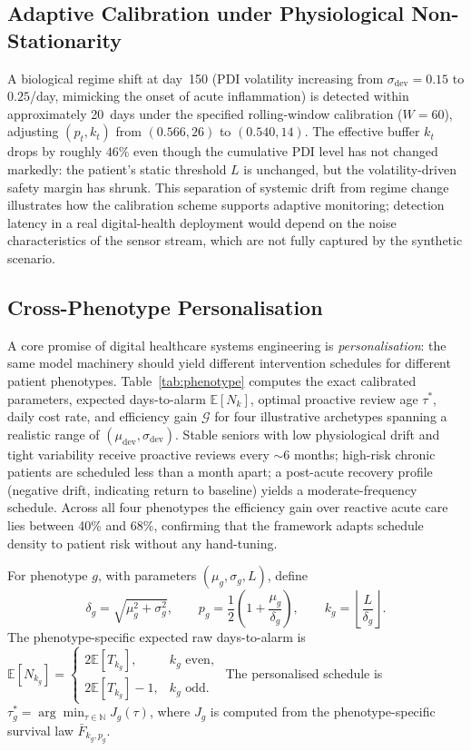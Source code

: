 \documentclass[pdflatex,sn-mathphys-num]{sn-jnl}
\theoremstyle{definition}
\newcommand{\E}{\mathbb{E}}
\numberwithin{equation}{section}
\begin{document}
\subsection{Adaptive Calibration under Physiological Non-Stationarity}\label{sec:case_rolling}

A biological regime shift at day~150 (PDI volatility increasing from $\sigma_{\mathrm{dev}}{=}0.15$ to $0.25$/day, mimicking the onset of acute inflammation) is detected within approximately 20~days under the specified rolling-window calibration ($W{=}60$), adjusting $(p_t,k_t)$ from $(0.566,26)$ to $(0.540,14)$. The effective buffer $k_t$ drops by roughly $46\%$ even though the cumulative PDI level has not changed markedly: the patient's static threshold $L$ is unchanged, but the volatility-driven safety margin has shrunk. This separation of systemic drift from regime change illustrates how the calibration scheme supports adaptive monitoring; detection latency in a real digital-health deployment would depend on the noise characteristics of the sensor stream, which are not fully captured by the synthetic scenario.

\subsection{Cross-Phenotype Personalisation}\label{sec:case_phenotype}

A core promise of digital healthcare systems engineering is \emph{personalisation}: the same model machinery should yield different intervention schedules for different patient phenotypes. Table~\ref{tab:phenotype} computes the exact calibrated parameters, expected days-to-alarm $\E[N_k]$, optimal proactive review age $\tau^*$, daily cost rate, and efficiency gain $\mathcal{G}$ for four illustrative archetypes spanning a realistic range of $(\mu_{\mathrm{dev}},\sigma_{\mathrm{dev}})$. Stable seniors with low physiological drift and tight variability receive proactive reviews every $\sim 6$ months; high-risk chronic patients are scheduled less than a month apart; a post-acute recovery profile (negative drift, indicating return to baseline) yields a moderate-frequency schedule. Across all four phenotypes the efficiency gain over reactive acute care lies between 40\% and 68\%, confirming that the framework adapts schedule density to patient risk without any hand-tuning.

For phenotype \(g\), with parameters \((\mu_g,\sigma_g,L)\), define
\[
\delta_g=\sqrt{\mu_g^2+\sigma_g^2},
\qquad
p_g=\frac12\left(1+\frac{\mu_g}{\delta_g}\right),
\qquad
k_g=\left\lfloor\frac{L}{\delta_g}\right\rfloor.
\]
The phenotype-specific expected raw days-to-alarm is
$\displaystyle \E[N_{k_g}]
=
\begin{cases}
2\E[T_{k_g}], & k_g \text{ even},\\
2\E[T_{k_g}]-1, & k_g \text{ odd}.
\end{cases}$
The personalised schedule is
$\displaystyle \tau_g^*
=
\arg\min_{\tau\in\mathbb N}
J_g(\tau)$,
where \(J_g\) is computed from the phenotype-specific survival law
\(\bar F_{k_g,p_g}\).
\end{document}
